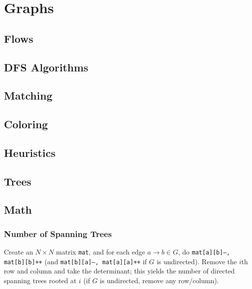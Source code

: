 \chapter{Graphs}

\section{Flows}

\section{DFS Algorithms}

\section{Matching}

\section{Coloring}

\section{Heuristics}

\section{Trees} 

\section{Math}
	\subsection{Number of Spanning Trees}
		Create an $N\times N$ matrix \texttt{mat}, and for each edge $a \rightarrow b \in G$, do
		\texttt{mat[a][b]--, mat[b][b]++} (and \texttt{mat[b][a]--, mat[a][a]++} if $G$ is undirected).
		Remove the $i$th row and column and take the determinant; this yields the number of directed spanning trees rooted at $i$
		(if $G$ is undirected, remove any row/column).

